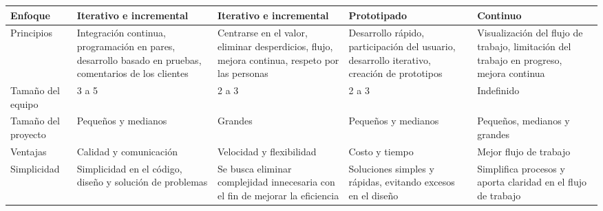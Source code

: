 \begin{longtable}{|p{2.5cm}|p{2.5cm}|p{2.5cm}|p{2.5cm}|p{2.5cm}|}
    \hline \hline
    \endlastfoot
    Enfoque                                        & Iterativo e incremental                                                                                & Iterativo e incremental                                                                        & Prototipado                                                                                & Continuo                                                                                \\\hline
    Principios                                     & Integración continua, programación en pares, desarrollo basado en pruebas, comentarios de los clientes & Centrarse en el valor, eliminar desperdicios, flujo, mejora continua, respeto por las personas & Desarrollo rápido, participación del usuario, desarrollo iterativo, creación de prototipos & Visualización del flujo de trabajo, limitación del trabajo en progreso, mejora continua \\\hline
    Tamaño del equipo                              & 3 a 5                                                                                                  & 2 a 3                                                                                          & 2 a 3                                                                                      & Indefinido                                                                              \\\hline
    Tamaño del proyecto                            & Pequeños y medianos                                                                                    & Grandes                                                                                        & Pequeños y medianos                                                                        & Pequeños, medianos y grandes                                                            \\\hline
    Ventajas                                       & Calidad y comunicación                                                                                 & Velocidad y flexibilidad                                                                       & Costo y tiempo                                                                             & Mejor flujo de trabajo                                                                  \\\hline
    Simplicidad                                    & Simplicidad en el código, diseño y solución de problemas                                               & Se busca eliminar complejidad innecesaria con el fin de mejorar la eficiencia                  & Soluciones simples y rápidas, evitando excesos en el diseño                                & Simplifica procesos y aporta claridad en el flujo de trabajo                            \\\hline

\end{longtable}
